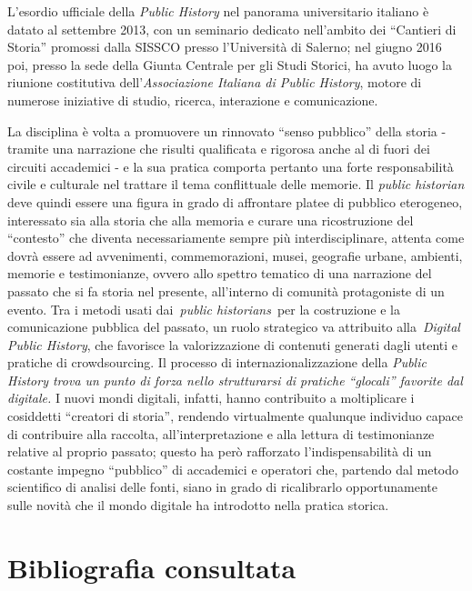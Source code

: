 \documentclass[
  b5paper,
  twoside,
  11pt,
  chapterprefix=false,
  bibliography=totocnumbered,
  parskip=0]{scrbook}
\begin{document}
L'esordio ufficiale della \emph{Public History} nel panorama universitario
italiano è datato al settembre 2013, con un seminario dedicato
nell'ambito dei \enquote{Cantieri di Storia} promossi dalla SISSCO presso
l'Università di Salerno; nel giugno 2016 poi, presso la sede della
Giunta Centrale per gli Studi Storici, ha avuto luogo la riunione
costitutiva dell'\emph{Associazione Italiana di Public History}, motore di
numerose iniziative di studio, ricerca, interazione e comunicazione.

La disciplina è volta a promuovere un rinnovato \enquote{senso pubblico} della
storia - tramite una narrazione che risulti qualificata e rigorosa anche
al di fuori dei circuiti accademici - e la sua pratica comporta pertanto
una forte responsabilità civile e culturale nel trattare il tema
conflittuale delle memorie. Il \emph{public historian} deve quindi essere una
figura in grado di affrontare platee di pubblico eterogeneo, interessato
sia alla storia che alla memoria e curare una ricostruzione del
\enquote{contesto} che diventa necessariamente sempre più interdisciplinare,
attenta come dovrà essere ad avvenimenti, commemorazioni, musei,
geografie urbane, ambienti, memorie e testimonianze, ovvero allo spettro
tematico di una narrazione del passato che si fa storia nel presente,
all'interno di comunità protagoniste di un evento. Tra i metodi usati
dai~\emph{public historians}~per la costruzione e la comunicazione pubblica
del passato, un ruolo strategico va attribuito alla~\emph{Digital Public
History}, che favorisce la valorizzazione di contenuti generati dagli
utenti e pratiche di crowdsourcing. Il processo di
internazionalizzazione della \emph{Public History trova un punto di forza
nello strutturarsi di pratiche \enquote{glocali} favorite dal digitale.} I nuovi
mondi digitali, infatti, hanno contribuito a moltiplicare i cosiddetti
\enquote{creatori di storia}, rendendo virtualmente qualunque individuo capace
di contribuire alla raccolta, all'interpretazione e alla lettura di
testimonianze relative al proprio passato; questo ha però rafforzato
l'indispensabilità di un costante impegno \enquote{pubblico} di accademici e
operatori che, partendo dal metodo scientifico di analisi delle fonti,
siano in grado di ricalibrarlo opportunamente sulle novità che il mondo
digitale ha introdotto nella pratica storica.

\hypertarget{bibliografia-consultata-5}{%
\section*{Bibliografia consultata}\label{bibliografia-consultata-5}}
\end{document}
